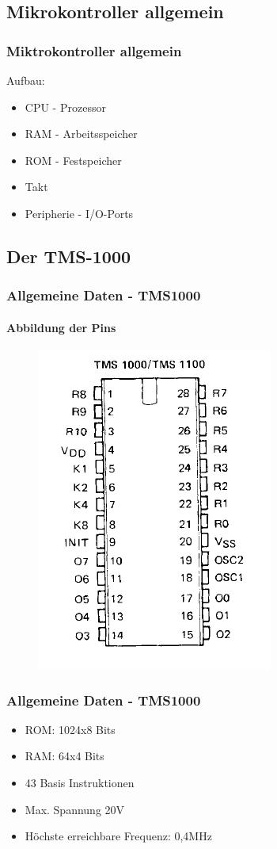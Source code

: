 \subsection{Mikrokontroller allgemein}
\begin{frame}
	\frametitle{Miktrokontroller allgemein}
		\begin{center}
		{\huge Aufbau:}
		\end{center}
		\begin{itemize}
		\item CPU - Prozessor \pause
		\item RAM - Arbeitsspeicher \pause
		\item ROM - Festspeicher \pause 
		\item Takt \pause
		\item Peripherie - I/O-Ports
		\end{itemize}
\end{frame}

\subsection{Der TMS-1000}
\begin{frame}
	\frametitle{Allgemeine Daten - TMS1000}
		\framesubtitle{Abbildung der Pins}
\begin{figure}
	\centering
		\includegraphics[scale=0.5]{images/pins.PNG}
\end{figure}

\end{frame}

\begin{frame}
	\frametitle{Allgemeine Daten - TMS1000}
	\begin{itemize}
		\item ROM: 1024x8 Bits \pause
		\item RAM: 64x4 Bits \pause
		\item 43 Basis Instruktionen \pause
		\item Max. Spannung 20V \pause
		\item H{\"o}chste erreichbare Frequenz: 0,4MHz
	\end{itemize}
\end{frame}


